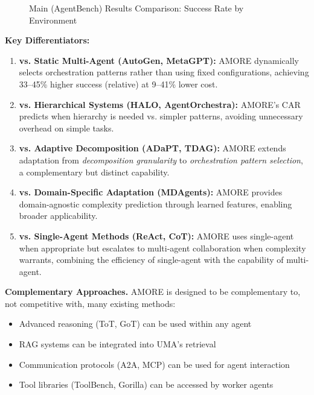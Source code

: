 \documentclass{article}
\theoremstyle{plain}
\theoremstyle{definition}
\theoremstyle{remark}
\begin{document}
\begin{figure}[t]
	\centering
	
	\caption{Main (AgentBench) Results Comparison: Success Rate by Environment}
	\label{fig:framework5}
\end{figure}

\textbf{Key Differentiators:}

\begin{enumerate}
	\item \textbf{vs. Static Multi-Agent (AutoGen, MetaGPT):} AMORE dynamically selects orchestration patterns rather than using fixed configurations, achieving 33--45\% higher success (relative) at 9--41\% lower cost.
	
	\item \textbf{vs. Hierarchical Systems (HALO, AgentOrchestra):} AMORE's CAR predicts when hierarchy is needed vs. simpler patterns, avoiding unnecessary overhead on simple tasks.
	
	\item \textbf{vs. Adaptive Decomposition (ADaPT, TDAG):} AMORE extends adaptation from \emph{decomposition granularity} to \emph{orchestration pattern selection}, a complementary but distinct capability.
	
	\item \textbf{vs. Domain-Specific Adaptation (MDAgents):} AMORE provides domain-agnostic complexity prediction through learned features, enabling broader applicability.
	
	\item \textbf{vs. Single-Agent Methods (ReAct, CoT):} AMORE uses single-agent when appropriate but escalates to multi-agent collaboration when complexity warrants, combining the efficiency of single-agent with the capability of multi-agent.
\end{enumerate}

\textbf{Complementary Approaches.} AMORE is designed to be complementary to, not competitive with, many existing methods:
\begin{itemize}
	\item Advanced reasoning (ToT, GoT) can be used within any agent
	\item RAG systems can be integrated into UMA's retrieval
	\item Communication protocols (A2A, MCP) can be used for agent interaction
	\item Tool libraries (ToolBench, Gorilla) can be accessed by worker agents
\end{itemize}
\end{document}
